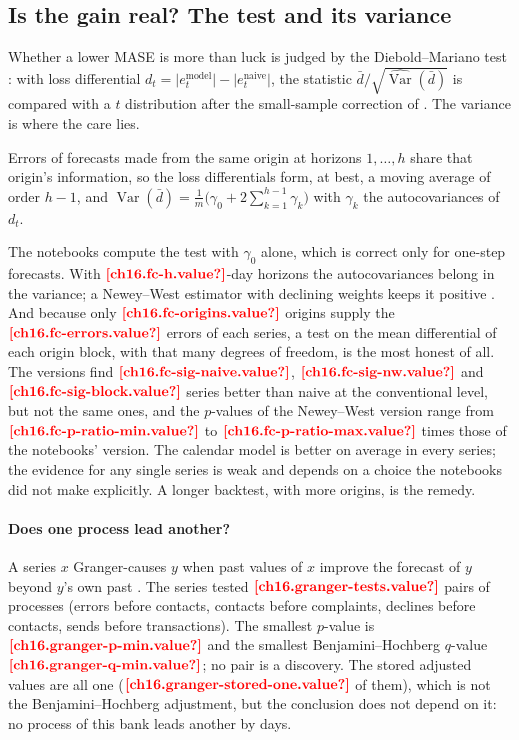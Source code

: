 \subsection{Is the gain real? The test and its variance}

Whether a lower MASE is more than luck is judged by the Diebold--Mariano test \autocite{diebold1995}: with loss differential
$d_t = \lvert e^{\text{model}}_t \rvert - \lvert e^{\text{naive}}_t \rvert$, the statistic $\bar d / \sqrt{\widehat{\operatorname{Var}}(\bar d)}$
is compared with a $t$ distribution after the small-sample correction of \textcite{harvey1997}. The variance is where the
care lies.

\begin{proposition}\label{prop:op-dm}
Errors of forecasts made from the same origin at horizons $1, \dots, h$ share that origin's information, so the loss
differentials form, at best, a moving average of order $h - 1$, and
$\operatorname{Var}(\bar d) = \frac{1}{m}\bigl(\gamma_0 + 2 \sum_{k=1}^{h-1} \gamma_k\bigr)$ with $\gamma_k$ the
autocovariances of $d_t$.
\end{proposition}

The notebooks compute the test with $\gamma_0$ alone, which is correct only for one-step forecasts. With
$\est{ch16.fc-h}{value}$-day horizons the autocovariances belong in the variance; a Newey--West estimator with declining
weights keeps it positive \autocite{newey1987}. And because only $\est{ch16.fc-origins}{value}$ origins supply the
$\est{ch16.fc-errors}{value}$ errors of each series, a test on the mean differential of each origin block, with that many
degrees of freedom, is the most honest of all. The versions find $\est{ch16.fc-sig-naive}{value}$,
$\est{ch16.fc-sig-nw}{value}$ and $\est{ch16.fc-sig-block}{value}$ series better than naive at the conventional level, but not
the same ones, and the $p$-values of the Newey--West version range from $\est{ch16.fc-p-ratio-min}{value}$ to
$\est{ch16.fc-p-ratio-max}{value}$ times those of the notebooks' version. The calendar model is better on average in every
series; the evidence for any single series is weak and depends on a choice the notebooks did not make explicitly. A longer
backtest, with more origins, is the remedy.



\paragraph{Does one process lead another?} A series $x$ Granger-causes $y$ when past values of $x$ improve the forecast of $y$
beyond $y$'s own past \autocite{granger1969}. The series tested $\est{ch16.granger-tests}{value}$ pairs of processes (errors
before contacts, contacts before complaints, declines before contacts, sends before transactions). The smallest $p$-value is
$\est{ch16.granger-p-min}{value}$ and the smallest Benjamini--Hochberg $q$-value $\est{ch16.granger-q-min}{value}$; no pair is
a discovery. The stored adjusted values are all one ($\est{ch16.granger-stored-one}{value}$ of them), which is not the
Benjamini--Hochberg adjustment, but the conclusion does not depend on it: no process of this bank leads another by days.

